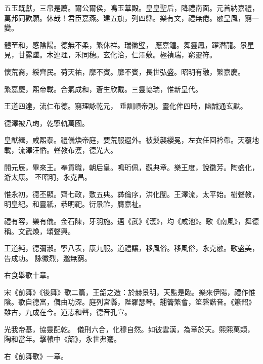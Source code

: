 \begin{pinyinscope}
 五玉既獻，三帛是薦。爾公爾侯，鳴玉華殿。皇皇聖后，降禮南面。元首納嘉禮，萬邦同歡願。休哉！君臣嘉燕。建五旗，列四縣。樂有文，禮無倦。融皇風，窮一變。



 體至和，感陰陽。德無不柔，繁休祥。瑞徽璧，
 應嘉鐘。舞靈鳳，躍潛龍。景星見，甘露墜。木連理，禾同穗。玄化洽，仁澤敷。極禎瑞，窮靈符。



 懷荒裔，綏齊民。荷天祐，靡不賓。靡不賓，長世弘盛。昭明有融，繁嘉慶。



 繁嘉慶，熙帝載。合氣成和，蒼生欣戴。三靈協瑞，惟新皇代。



 王道四達，流仁布德。窮理詠乾元，
 垂訓順帝則。靈化侔四時，幽誠通玄默。



 德澤被八珣，乾寧軌萬國。



 皇猷緝，咸熙泰。禮儀煥帝庭，要荒服遐外。被髮襲纓冕，左衣任回衿帶。天覆地載，流澤汪惛。聲教布濩，德光大。



 開元辰，畢來王。奉貢職，朝后皇。鳴珩佩，觀典章。樂王度，說徽芳。陶盛化，游太康。
 丕昭明，永克昌。



 惟永初，德丕顯。齊七政，敷五典。彞倫序，洪化闡。王澤流，太平始。樹聲教，明皇紀。和靈祇，恭明祀。衍景祚，膺嘉祉。



 禮有容，樂有儀。金石陳，牙羽施。邁《武》《濩》，均《咸池》。歌《南風》，舞德稱。文武煥，頌聲興。



 王道純，德彌淑。寧八表，康九服。道禮讓，移風俗。移風俗，永克融。歌盛美，告成功。
 詠徽烈，邈無窮。


右食舉歌十章。



 宋《前舞》《後舞》歌二篇，王韶之造：於赫景明，天監是臨。樂來伊陽，禮作惟陰。歌自德富，儛由功深。庭列宮縣，陛羅瑟琴。翿籥繁會，笙磬諧音。《簫韶》雖古，九成在今。道志和聲，德音孔宣。



 光我帝基，協靈配乾。
 儀刑六合，化穆自然。如彼雲漢，為章於天。熙熙萬類，陶和當年。擊轅中《韶》，永世弗騫。


右《前舞歌》一章。




\end{pinyinscope}
